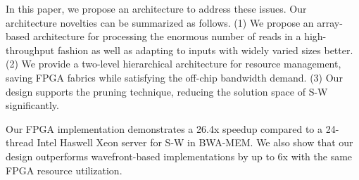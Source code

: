 In this paper, we propose an architecture to address these issues.
Our architecture novelties can be summarized as follows. 
(1) We propose an array-based architecture for processing the enormous number of reads in a high-throughput fashion as well as adapting to inputs with widely varied sizes better. 
(2) We provide a two-level hierarchical architecture for resource management, saving FPGA fabrics while satisfying the off-chip bandwidth demand.
(3) Our design supports the pruning technique, reducing the solution space of S-W significantly. 

Our FPGA implementation demonstrates a 26.4x speedup compared to a 24-thread Intel Haswell Xeon server for S-W in BWA-MEM. 
We also show that our design outperforms wavefront-based implementations by up to 6x with the same FPGA resource utilization.
